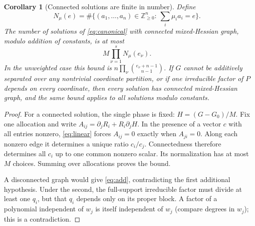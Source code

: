 \documentclass[11pt]{article}
\numberwithin{equation}{section}
\newtheorem{corollary}[theorem]{Corollary}
\theoremstyle{definition}\newtheorem{definition}[theorem]{Definition}
\theoremstyle{remark}\newtheorem{remark}[theorem]{Remark}
\newcommand{\NN}{\mathbb Z_{\geq0}}
\begin{document}
\begin{corollary}[Connected solutions are finite in number]\label{cor:count}
Define
\[
 N_\mu(e)=\#\{(a_1,\ldots,a_n)\in\NN^n:\ \sum_i\mu_i a_i=e\}.
\]
The number of solutions of \eqref{eq:canonical} with connected
mixed-Hessian graph, modulo addition of constants, is at most
\begin{equation}\label{eq:count}
 M\prod_{\nu=1}^s N_\mu(e_\nu).
\end{equation}
In the unweighted case this bound is
$n\prod_\nu\binom{e_\nu+n-1}{n-1}$.
If $G$ cannot be additively separated over any nontrivial coordinate
partition, or if one irreducible factor of $P$ depends on every coordinate,
then every solution has connected mixed-Hessian graph, and the same
bound applies to all solutions modulo constants.
\end{corollary}
\begin{proof}
For a connected solution, the single phase is fixed:
$H=(G-G_0)/M$. Fix one allocation and write
$A_{ij}=\partial_jR_i+R_i\partial_jH$. In the presence of a vector
$c$ with all entries nonzero, \eqref{eq:linear} forces $A_{ij}=0$ exactly
when $A_{ji}=0$. Along each nonzero edge it determines a unique ratio
$c_i/c_j$. Connectedness therefore determines all $c_i$ up to one common
nonzero scalar. Its normalization has at most $M$ choices. Summing over
allocations proves the bound.

A disconnected graph would give \eqref{eq:add}, contradicting the first
additional hypothesis. Under the second, the full-support irreducible
factor must divide at least one $q_i$, but that $q_i$ depends only on its
proper block. A factor of a polynomial independent of $w_j$ is itself
independent of $w_j$ (compare degrees in $w_j$); this is a contradiction.
\end{proof}
\end{document}
